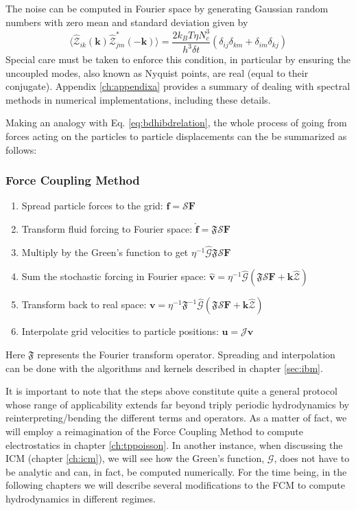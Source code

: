 \documentclass[twoside,openright,titlepage,numbers=noenddot,%
headinclude,footinclude,cleardoublepage=empty,abstract=on,
BCOR=5mm,fontsize=11pt, dvipsnames, paper=b5
]{scrreprt}
\renewcommand{\vec}[1]{\bm{#1}}
\newcommand{\tens}[1]{\bm{\mathcal{#1}}}
\newcommand{\oper}[1]{\mathcal{#1}}
\newcommand{\dt}{\delta t}
\newcommand{\kT}{k_B T}
\newcommand{\fou}[1]{\widehat{#1}}
\newcommand{\pvel}{u}
\newcommand{\fvel}{v}
\begin{document}
The noise can be computed in Fourier space by generating Gaussian random numbers with zero mean and standard deviation given by
\begin{equation}
  \langle \fou{\mathcal{Z}}_{ik}(\vec{k})\fou{\mathcal{Z}}^*_{jm} (-\vec{k})\rangle = \frac{2\kT\eta N_c^3}{ h^3 \dt}(\delta_{ij}\delta_{km} + \delta_{im}\delta_{kj})
\end{equation}
Special care must be taken to enforce this condition, in particular by ensuring the uncoupled modes, also known as Nyquist points, are real (equal to their conjugate). Appendix \ref{ch:appendixa} provides a summary of dealing with spectral methods in numerical implementations, including these details.

Making an analogy with Eq. \eqref{eq:bdhibdrelation}, the whole process of going from forces acting on the particles to particle displacements can the be summarized as follows:
\subsubsection*{Force Coupling Method}
\begin{enumerate}
\item Spread particle forces to the grid: $\vec{f} = \oper{S}\vec{F}$
\item Transform fluid forcing to Fourier space: $\fou{\vec{f}} = \mathfrak{F}\oper{S}\vec{F}$
\item Multiply by the Green's function to get $\eta^{-1}\fou{\tens{G}}\mathfrak{F}\oper{S}\vec{F}$
\item Sum the stochastic forcing in Fourier space: $\fou{\vec{\fvel}} = \eta^{-1}\fou{\tens{G}}(\mathfrak{F}\oper{S}\vec{F} + \vec{k}\fou{\mathcal{Z}})$
\item Transform back to real space: $\vec{\fvel} = \eta^{-1}\mathfrak{F}^{-1}\fou{\tens{G}}(\mathfrak{F}\oper{S}\vec{F} + \vec{k}\fou{\mathcal{Z}})$
\item Interpolate grid velocities to particle positions: $\vec{\pvel} = \oper{J}\vec{\fvel}$
\end{enumerate}
Here $\mathfrak{F}$ represents the Fourier transform operator.
Spreading and interpolation can be done with the algorithms and kernels described in chapter \ref{sec:ibm}. 

It is important to note that the steps above constitute quite a general protocol whose range of applicability extends far beyond triply periodic hydrodynamics by reinterpreting/bending the different terms and operators. As a matter of fact, we will employ a reimagination of the Force Coupling Method to compute electrostatics in chapter \ref{ch:tppoisson}. In another instance, when discussing the \gls{ICM} (chapter \ref{ch:icm}), we will see how the Green's function, $\tens{G}$, does not have to be analytic and can, in fact, be computed numerically. For the time being, in the following chapters we will describe several modifications to the \gls{FCM} to compute hydrodynamics in different regimes.
\end{document}
